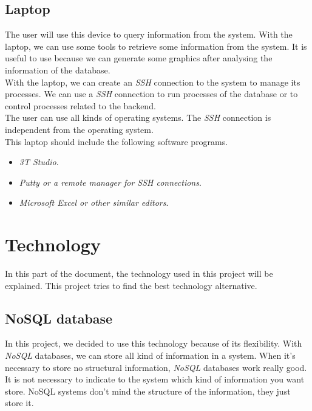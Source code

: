 \subsection{Laptop}

The user will use this device to query information from the system. With the laptop, we can use some tools to retrieve some information from the system. It is useful to use because we can generate some graphics after analysing the information of the database.\\

With the laptop, we can create an \textit{SSH} connection to the system to manage its processes. We can use a \textit{SSH} connection to run processes of the database or to control processes related to the backend.\\

The user can use all kinds of operating systems. The \textit{SSH} connection is independent from the operating system. \\

This laptop should include the following software programs.

\begin{itemize}

\item \textit{3T Studio}.

\item \textit{Putty or a remote manager for SSH connections}.

\item \textit{Microsoft Excel or other similar editors}.

\end{itemize}

\section{Technology}

In this part of the document, the technology used in this project will be explained. This project tries to find the best technology alternative.

\subsection{NoSQL database}

In this project, we decided to use this technology because of its flexibility. With \textit{NoSQL} databases, we can store all kind of information in a system. When it's necessary to store no structural information, \textit{NoSQL} databases work really good. It is not necessary to indicate to the system which kind of information you want store. NoSQL systems don't mind the structure of the information, they just store it.\\

